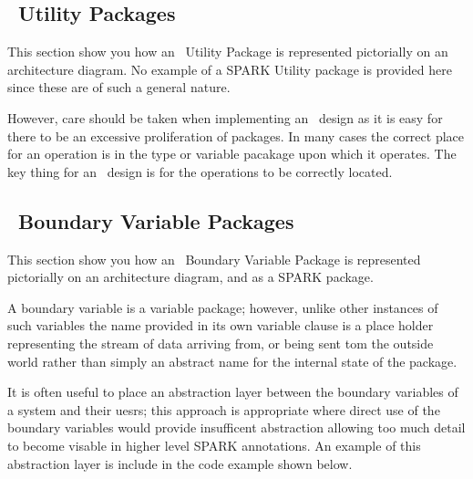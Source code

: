 \subsection{\informed\ Utility Packages}
\noindent\parbox[][][t]{.2\linewidth}{
    }%
 \parbox[][][t]{.8\linewidth}{

This section show you how an \informed\ Utility Package is represented pictorially on an architecture
diagram. No example of a SPARK Utility package is provided here since these are of such a general nature.
}
However, care should be taken when implementing an \informed\ design as it is easy for there to be
an excessive proliferation of packages. In many cases the correct place for an operation is in the
type or variable pacakage upon which it operates. The key thing for an \informed\ design is for the
operations to be correctly located.


\subsection{\informed\ Boundary Variable Packages}
\noindent\parbox[][][t]{.2\linewidth}{
    }%
 \parbox[][][t]{.8\linewidth}{

This section show you how an \informed\ Boundary Variable Package is represented pictorially on an architecture
diagram, and as a SPARK package.
}
A boundary variable is a variable package; however, unlike other instances of such variables the name
provided in its own variable clause is a place holder representing the stream of data arriving from,
or being sent tom the outside world rather than simply an abstract name for the internal state of the
package.

It is often useful to place an abstraction layer between the boundary variables of a system and their uesrs;
this approach is appropriate where direct use of the boundary variables would provide insufficent abstraction
allowing too much detail to become visable in higher level SPARK annotations. An example of this abstraction
layer is include in the code example shown below.

